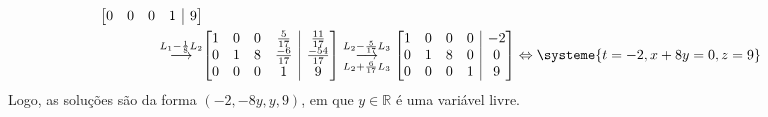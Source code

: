 \documentclass[12pt,a4paper]{article}
\makeatletter
\newcommand*\R{\mathbb{R}}
\newenvironment{amatrix}[1]{%
  \left[\begin{array}{@{}*{#1}{c}|c@{}}
}{%
  \end{array}\right]
}
\newcommand{\grstep}[2][\relax]{%
   \ensuremath{\mathrel{
       {\mathop{\longrightarrow}\limits^{#2\mathstrut}_{
                                     \begin{subarray}{l} #1 \end{subarray}}}}}}
\makeatother
\begin{document}
\begin{ExerciseList}
\begin{align*}
\begin{amatrix}{4}
0 & 0 & 0 & 1 & 9
\end{amatrix}\\
\grstep{ L_1 -\frac{1}{8} L_2 }
&
\begin{amatrix}{4}
1 & 0 & 0 & \frac{5}{17} & \frac{11}{17} \\
0 & 1 & 8 & \frac{-6}{17} & \frac{-54}{17} \\
0 & 0 & 0 & 1 & 9
\end{amatrix}
\grstep[ L_2 + \frac{6}{17} L_3 ]{ L_2 - \frac{5}{17} L_3 }
\begin{amatrix}{4}
1 & 0 & 0 & 0 & -2 \\
0 & 1 & 8 & 0 & 0 \\
0 & 0 & 0 & 1 & 9
\end{amatrix}
\Leftrightarrow
\systeme{
t=-2,
x+8y=0,
z=9
}
\end{align*}
Logo, as soluções são da forma $(-2, -8y, y, 9)$, em que $y \in \R$ é uma variável livre.


\end{ExerciseList}
\end{document}

